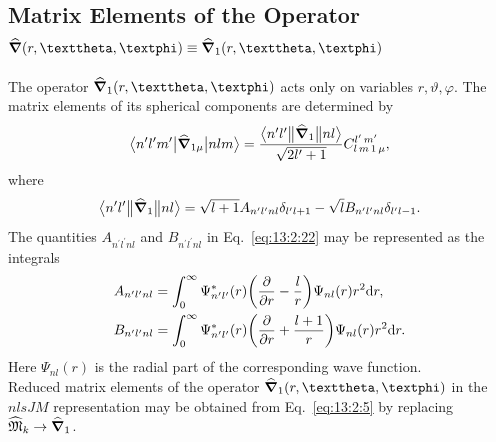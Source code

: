 \subsection{Matrix Elements of the Operator \(\delop(r, \vartheta, \varphi) \equiv \delop_{1}(r, \vartheta, \varphi)\)}\label{sec:13.2.4}
The operator \(\delop_{1}(r, \vartheta, \varphi)\) acts only on variables \(r, \vartheta, \varphi\). The matrix elements of its spherical components are determined by
\begin{equation}
\bigl\langle  n^{\prime} l^{\prime} m^{\prime} \big|  \widehat{\boldsymbol{\nabla}}_{1 \mu} \big| n l m \bigr\rangle=
\frac{
\bigl\langle  n^{\prime} l^{\prime} \big\Vert \widehat{\boldsymbol{\nabla}}_{1} \big\Vert  n l \bigr\rangle}{\sqrt{2 l^{\prime}+1}} 
C_{l\,m\,1\,\mu}^{l^{\prime}\,m^{\prime}}, \label{eq:13:2:21}
\end{equation}
where
\begin{equation}
\bigl\langle  n^{\prime} l^{\prime} \big\Vert \widehat{\boldsymbol{\nabla}}_{1} \big\Vert  n l \bigr\rangle=\sqrt{l+1} A_{n^{\prime} l^{\prime} n l} \delta_{l^{\prime} l+1}-\sqrt{l} B_{n^{\prime} l^{\prime} n l} \delta_{l^{\prime} l-1}. \label{eq:13:2:22}
\end{equation}
The quantities \(A_{n^{\prime} l^{\prime} n l}\) and \(B_{n^{\prime} l^{\prime} n l}\) in Eq.~\eqref{eq:13:2:22} may be represented as the integrals
\begin{align}
& A_{n^{\prime} l^{\prime} n l}=\int_{0}^{\infty} \Psi_{n^{\prime} l^{\prime}}^{*}(r)\biggl(\frac{\partial}{\partial r}-\frac{l}{r}\biggr) \Psi_{n l}(r) r^{2} \mathrm{d} r ,\notag\\
& B_{n^{\prime} l^{\prime} n l}=\int_{0}^{\infty} \Psi_{n^{\prime} l^{\prime}}^{*}(r)\biggl(\frac{\partial}{\partial r}+\frac{l+1}{r}\biggr) \Psi_{n l}(r) r^{2} \mathrm{d} r. \label{eq:13:2:23}
\end{align}
Here \(\Psi_{n l}(r)\) is the radial part of the corresponding wave function.\\
Reduced matrix elements of the operator \(\delop_{1}(r, \vartheta, \varphi)\) in the $nlsJM$ representation may be obtained from Eq.~\eqref{eq:13:2:5} by replacing \(\widehat{\mathfrak{M}}_{k} \rightarrow \widehat{\boldsymbol{\nabla}}_{1}\).

